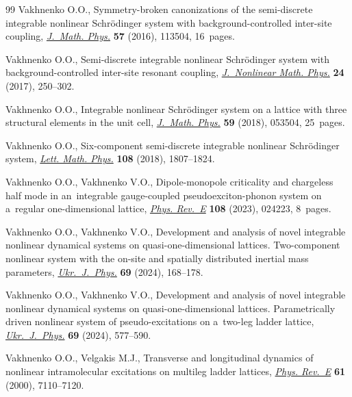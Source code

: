 \documentclass[10pt,a4paper]{amsart}
\numberwithin{equation}{section}
\begin{document}
\begin{thebibliography}{99}
Vakhnenko O.O., Symmetry-broken canonizations of the semi-discrete integrable
 nonlinear {S}chr\"odinger system with background-controlled inter-site
 coupling, \href{https://doi.org/10.1063/1.4968244}{\textit{J.~Math. Phys.}}
 \textbf{57} (2016), 113504, 16~pages.

Vakhnenko O.O., Semi-discrete integrable nonlinear {S}chr\"odinger system with
 background-controlled inter-site resonant coupling,
 \href{https://doi.org/10.1080/14029251.2017.1316011}{\textit{J.~Nonlinear
 Math. Phys.}} \textbf{24} (2017), 250--302.

Vakhnenko O.O., Integrable nonlinear {S}chr\"odinger system on a lattice with
 three structural elements in the unit cell,
 \href{https://doi.org/10.1063/1.4994622}{\textit{J.~Math. Phys.}} \textbf{59}
 (2018), 053504, 25~pages.

Vakhnenko O.O., Six-component semi-discrete integrable nonlinear
 {S}chr\"odinger system,
 \href{https://doi.org/10.1007/s11005-018-1049-0}{\textit{Lett. Math. Phys.}}
 \textbf{108} (2018), 1807--1824.

Vakhnenko O.O., Vakhnenko V.O., Dipole-monopole criticality and chargeless half
 mode in an~integrable gauge-coupled pseudoexciton-phonon system on a~regular
 one-dimensional lattice,
 \href{https://doi.org/10.1103/physreve.108.024223}{\textit{Phys. Rev.~E}}
 \textbf{108} (2023), 024223, 8~pages.

Vakhnenko O.O., Vakhnenko V.O., Development and analysis of novel integrable
 nonlinear dynamical systems on quasi-one-dimensional lattices. Two-component
 nonlinear system with the on-site and spatially distributed inertial mass
 parameters,
 \href{https://doi.org/10.15407/ujpe69.3.168}{\textit{Ukr.~J.~Phys.}}
 \textbf{69} (2024), 168--178.

Vakhnenko O.O., Vakhnenko V.O., Development and analysis of novel integrable
 nonlinear dynamical systems on quasi-one-dimensional lattices. Parametrically
 driven nonlinear system of pseudo-excitations on a~two-leg ladder lattice,
 \href{https://doi.org/10.15407/ujpe69.8.577}{\textit{Ukr.~J.~Phys.}}
 \textbf{69} (2024), 577--590.


Vakhnenko O.O., Velgakis M.J., Transverse and longitudinal dynamics of
 nonlinear intramolecular excitations on multileg ladder lattices,
 \href{https://doi.org/10.1103/PhysRevE.61.7110}{\textit{Phys. Rev.~E}}
 \textbf{61} (2000), 7110--7120.


\end{thebibliography}
\end{document}
